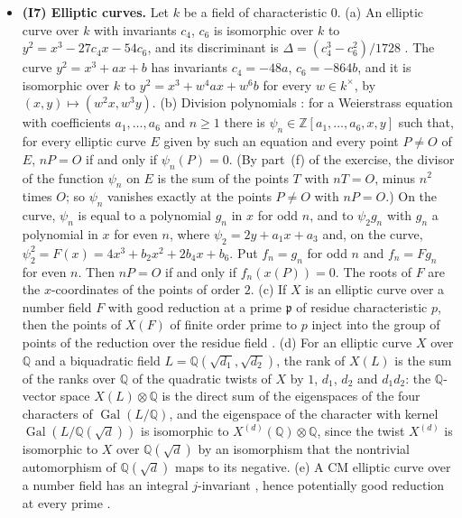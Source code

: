 \documentclass[11pt]{article}
\newcommand{\Q}{\mathbb Q}
\newcommand{\Z}{\mathbb Z}
\DeclareMathOperator{\Gal}{Gal}
\begin{document}
\begin{itemize}
\item \textbf{(I7) Elliptic curves.} Let \(k\) be a field of characteristic \(0\). (a) An elliptic curve over
\(k\) with invariants \(c_4\), \(c_6\) is isomorphic over \(k\) to \(y^2=x^3-27c_4x-54c_6\), and its discriminant
is \(\Delta=(c_4^3-c_6^2)/1728\) \cite[Section~III.1]{Si1}. The curve \(y^2=x^3+ax+b\) has invariants
\(c_4=-48a\), \(c_6=-864b\), and it is isomorphic over \(k\) to \(y^2=x^3+w^4ax+w^6b\) for every \(w\in k^\times\),
by \((x,y)\mapsto(w^2x,w^3y)\). (b) Division polynomials \cite[Exercise~III.3.7]{Si1}: for a Weierstrass equation
with coefficients \(a_1,\dots,a_6\) and \(n\ge1\) there is \(\psi_n\in\Z[a_1,\dots,a_6,x,y]\) such that, for every
elliptic curve \(E\) given by such an equation and every point \(P\neq O\) of \(E\), \(nP=O\) if and only if
\(\psi_n(P)=0\). (By part~(f) of the exercise, the divisor of the function \(\psi_n\) on \(E\) is the sum of the
points \(T\) with \(nT=O\), minus \(n^2\) times \(O\); so \(\psi_n\) vanishes exactly at the points \(P\neq O\)
with \(nP=O\).) On the curve, \(\psi_n\) is equal to a polynomial \(g_n\) in \(x\) for odd \(n\), and
to \(\psi_2g_n\) with \(g_n\) a polynomial in \(x\) for even \(n\), where \(\psi_2=2y+a_1x+a_3\) and, on the curve,
\(\psi_2^2=F(x)=4x^3+b_2x^2+2b_4x+b_6\). Put \(f_n=g_n\) for odd \(n\) and \(f_n=Fg_n\) for even \(n\). Then
\(nP=O\) if and only if \(f_n(x(P))=0\). The roots of \(F\) are the \(x\)-coordinates of the points of order
\(2\). (c) If \(X\) is an elliptic curve over a number field \(F\) with good reduction at a prime \(\mathfrak p\)
of residue characteristic \(p\), then the points of \(X(F)\) of finite order prime to \(p\) inject into the group
of points of the reduction over the residue field \cite[Proposition~VII.3.1]{Si1}. (d) For an elliptic curve \(X\)
over \(\Q\) and a biquadratic field \(L=\Q(\sqrt{d_1},\sqrt{d_2})\), the rank of \(X(L)\) is the sum of the ranks
over \(\Q\) of the quadratic twists of \(X\) by \(1\), \(d_1\), \(d_2\) and \(d_1d_2\): the
\(\Q\)-vector space \(X(L)\otimes\Q\) is the direct sum of the eigenspaces of the four characters of
\(\Gal(L/\Q)\), and the eigenspace of the character with kernel \(\Gal(L/\Q(\sqrt d))\) is isomorphic to
\(X^{(d)}(\Q)\otimes\Q\), since the twist \(X^{(d)}\) is isomorphic to \(X\) over \(\Q(\sqrt d)\) by an isomorphism
that the nontrivial automorphism of \(\Q(\sqrt d)\) maps to its negative. (e) A CM elliptic curve over a number
field has an integral \(j\)-invariant \cite[Theorem~II.6.1]{Si2}, hence potentially good reduction at every prime
\cite[Proposition~VII.5.5]{Si1}.
\end{itemize}
\end{document}
